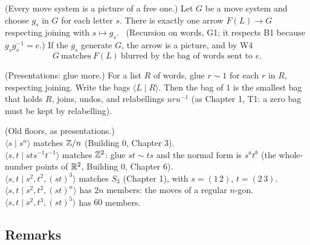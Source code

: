 \begin{lines}
\item[\lab{T1}] (Every move system is a picture of a free one.) Let $G$ be a move system and choose $g_s$ in $G$ for each letter $s$. There is exactly one arrow $F(L) \to G$ respecting joining with $s \mapsto g_s$. \ (Recursion on words, G1; it respects B1 because $g_s g_s^{-1} = e$.) If the $g_s$ generate $G$, the arrow is a picture, and by W4 \[ G \ \text{matches} \ F(L) \ \text{blurred by the bag of words sent to } e . \]
\item[\lab{T2}] (Presentations: glue more.) For a list $R$ of words, glue $r \sim 1$ for each $r$ in $R$, respecting joining. Write the bags $\langle L \mid R \rangle$. Then the bag of $1$ is the smallest bag that holds $R$, joins, undos, and relabellings $u r u^{-1}$ (as Chapter 1, T1: a zero bag must be kept by relabelling).
\item[\lab{T3}] (Old floors, as presentations.) \\
$\langle s \mid s^n \rangle$ matches $\mathbb{Z}/n$ (Building 0, Chapter 3). \\
$\langle s, t \mid s t s^{-1} t^{-1} \rangle$ matches $\mathbb{Z}^2$: glue $st \sim ts$ and the normal form is $s^a t^b$ (the whole-number points of $\mathbb{R}^2$, Building 0, Chapter 6). \\
$\langle s, t \mid s^2, t^2, (st)^3 \rangle$ matches $S_3$ (Chapter 1), with $s = (1\,2)$, $t = (2\,3)$. \\
$\langle s, t \mid s^2, t^2, (st)^n \rangle$ has $2n$ members: the moves of a regular $n$-gon. \\
$\langle s, t \mid s^2, t^3, (st)^5 \rangle$ has $60$ members.
\end{lines}

\subsection*{Remarks}

